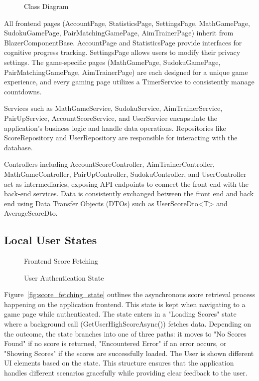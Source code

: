 \documentclass[11pt,a4paper]{article}
\newcommand{\inputdiagram}[1]{}
\newcommand{\textwidthdiagram}[2][1]{%
  \resizebox{#1\textwidth}{!}{\inputdiagram{#2}}%
}
\begin{document}
\begin{figure}[H]
    \centering
    \textwidthdiagram{class_diagram.latex}
    \caption{Class Diagram}
    \label{fig:class_diagram}
\end{figure}


All frontend pages (AccountPage, StatisticsPage, SettingsPage, MathGamePage, SudokuGamePage, PairMatchingGamePage, AimTrainerPage) inherit from BlazerComponentBase. AccountPage and StatisticsPage provide interfaces for cognitive progress tracking. SettingsPage allows users to modify their privacy settings. The game-specific pages (MathGamePage, SudokuGamePage, PairMatchingGamePage, AimTrainerPage) are each designed for a unique game experience, and every gaming page utilizes a TimerService to consistently manage countdowns.

Services such as MathGameService, SudokuService, AimTrainerService, PairUpService, AccountScoreService, and UserService encapsulate the application's business logic and handle data operations. Repositories like ScoreRepository and UserRepository are responsible for interacting with the database.

Controllers including AccountScoreController, AimTrainerController, MathGameController, PairUpController, SudokuController, and UserController act as intermediaries, exposing API endpoints to connect the front end with the back-end services. Data is consistently exchanged between the front end and back end using Data Transfer Objects (DTOs) such as UserScoreDto<T> and AverageScoreDto. 

\subsection{Local User States}
\begin{figure}[H]
    \centering
    \begin{minipage}[b]{0.59\textwidth}
        \centering
        \textwidthdiagram{score_fetching_state.tex}
        \caption{Frontend Score Fetching}
        \label{fig:score_fetching_state}
    \end{minipage}
    \hfil
    \begin{minipage}[b]{0.4\textwidth}
        \centering
        \textwidthdiagram{user_authentication_state.tex}
        \caption{User Authentication State}
        \label{fig:user_authentication_state}
    \end{minipage}
\end{figure}

Figure~\ref{fig:score_fetching_state} outlines the asynchronous score
retrieval process happening on the application frontend. This state is kept
when navigating to a game page while authenticated. The state enters in a
"Loading Scores" state where a background call (GetUserHighScoreAsync())
fetches data. Depending on the outcome, the state branches into one
of three paths: it moves to "No Scores Found" if no score is returned,
"Encountered Error" if an error occurs, or "Showing Scores" if the scores
are successfully loaded. The User is shown different UI elements based on
the state. This structure ensures that the application handles different
scenarios gracefully while providing clear feedback to the user.
\end{document}

